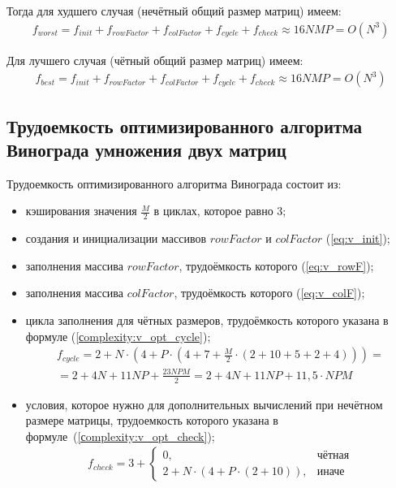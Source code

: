Тогда для худшего случая (нечётный общий размер матриц) имеем:
\begin{equation}
	\label{eq:vinograd_worst}
	\begin{gathered}
		f_{worst} = f_{init} + f_{rowFactor} + f_{colFactor} + f_{cycle} + f_{check} \approx 16NMP = O(N^3)
	\end{gathered}
\end{equation}

Для лучшего случая (чётный общий размер матриц) имеем:
\begin{equation}
	\label{eq:vinograd_best}
	\begin{gathered}
		f_{best} = f_{init} + f_{rowFactor} + f_{colFactor} + f_{cycle} + f_{check} \approx 16NMP = O(N^3)
	\end{gathered}
\end{equation}

\clearpage

\subsection{Трудоемкость оптимизированного алгоритма Винограда умножения двух матриц}

Трудоемкость оптимизированного алгоритма Винограда состоит из:
\begin{itemize}[label=---]
	\item кэширования значения $\frac{M}{2}$ в циклах, которое равно 3;
	\item создания и инициализации массивов $rowFactor$ и $colFactor$ (\ref{eq:v_init});
	\item заполнения массива $rowFactor$, трудоёмкость которого (\ref{eq:v_rowF});
	\item заполнения массива $colFactor$, трудоёмкость которого (\ref{eq:v_colF});
	\item цикла заполнения для чётных размеров, трудоёмкость которого указана в формуле (\ref{сomplexity:v_opt_cycle});
	\begin{equation}
		\label{сomplexity:v_opt_cycle}
		\begin{aligned}
			f_{cycle} = 2 + N \cdot (4 + P \cdot (4 + 7 + \frac{M}{2} \cdot (2 + 10 + 5 + 2 + 4))) = \\
			= 2 + 4N + 11NP + \frac{23NPM}{2}  = 2 + 4N + 11NP + 11,5 \cdot NPM 
		\end{aligned}
	\end{equation}
	\item условия, которое нужно для дополнительных вычислений при нечётном размере матрицы, трудоемкость которого указана в формуле~(\ref{сomplexity:v_opt_check});
	\begin{equation}
		\label{сomplexity:v_opt_check}
		\begin{aligned}
			f_{check} = 3 + 
			\begin{cases}
				0, & \text{чётная} \\
				2 + N \cdot (4 + P \cdot (2 + 10)), & \text{иначе}
			\end{cases}
		\end{aligned}  
	\end{equation}
\end{itemize}

